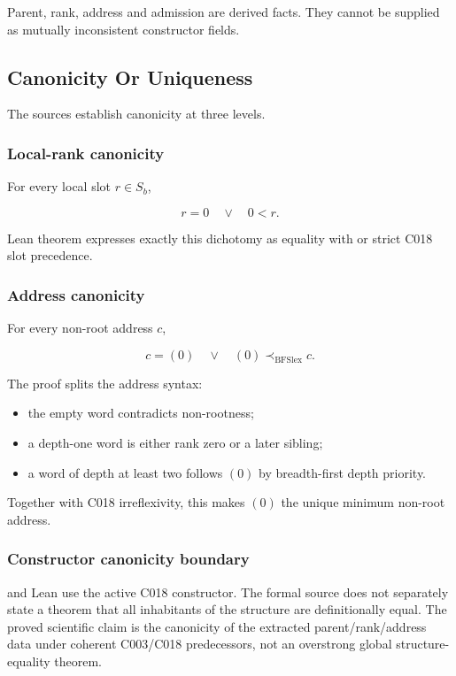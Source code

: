 Parent, rank, address and admission are derived facts. They cannot be
supplied as mutually inconsistent constructor fields.

\subsection{Canonicity Or Uniqueness}\label{canonicity-or-uniqueness-2}

The sources establish canonicity at three levels.

\subsubsection{Local-rank canonicity}\label{local-rank-canonicity}

For every local slot \(r\in S_b\),

\[
r=0\quad\lor\quad 0<r.
\]

Lean theorem \texttt{\protect{}} expresses exactly this
dichotomy as equality with \texttt{\protect{}} or strict C018 slot
precedence.

\subsubsection{Address canonicity}\label{address-canonicity}

For every non-root address \(c\),

\[
c=(0)\quad\lor\quad(0)\prec_{\mathrm{BFSlex}}c.
\]

The proof splits the address syntax:

\begin{itemize}
\tightlist
\item
  the empty word contradicts non-rootness;
\item
  a depth-one word is either rank zero or a later sibling;
\item
  a word of depth at least two follows \((0)\) by breadth-first depth
  priority.
\end{itemize}

Together with C018 irreflexivity, this makes \((0)\) the unique minimum
non-root address.

\subsubsection{Constructor canonicity
boundary}\label{constructor-canonicity-boundary}

\texttt{\protect{}} and Lean
\texttt{\protect{}} use the active C018 constructor. The formal source does
not separately state a theorem that all inhabitants of the
\texttt{\protect{}} structure are definitionally equal. The
proved scientific claim is the canonicity of the extracted
parent/rank/address data under coherent C003/C018 predecessors, not an
overstrong global structure-equality theorem.

